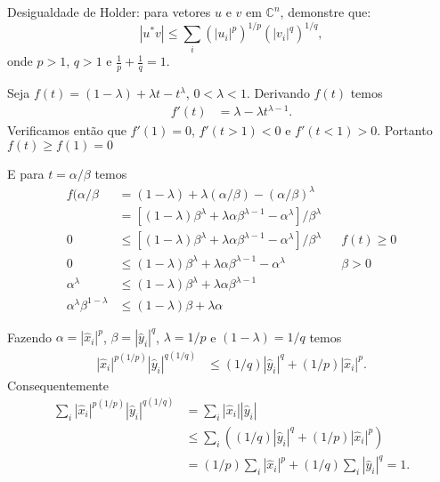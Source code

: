 \documentclass[a4paper,12pt, leqno, answers]{exam}
\begin{document}
\thispagestyle{headandfoot}
\begin{questions}
     Desigualdade de Holder: para vetores $u$ e $v$ em $\mathbb{C}^n$, demonstre que:
    \[
    | u^* v | \leq \sum_i \left( | u_i |^p \right)^{1/p} \left( | v_i |^q \right)^{1/q},
    \]
    onde $p > 1$, $q > 1$ e $\frac{1}{p} + \frac{1}{q} = 1$.
    \begin{solution}
        Seja $f(t) = \left( 1 - \lambda \right) + \lambda t - t^\lambda$, $0 < \lambda < 1$. Derivando $f(t)$ temos
        \begin{align*}
            f'(t) &= \lambda - \lambda t^{\lambda - 1}.
        \end{align*}
        Verificamos ent\~{a}o que $f'(1) = 0$, $f'(t > 1) < 0$ e $f'(t < 1) > 0$. Portanto $f(t) \geq f(1) = 0$ 

        E para $t = \alpha / \beta$ temos
        \begin{align*}
            f(\alpha / \beta &= \left( 1 - \lambda \right) + \lambda \left( \alpha / \beta \right) - \left( \alpha / \beta \right)^\lambda \\
            &= \left[ \left( 1 - \lambda \right) \beta^\lambda + \lambda \alpha \beta^{\lambda - 1} - \alpha^\lambda \right] / \beta^\lambda \\
            0 &\leq \left[ \left( 1 - \lambda \right) \beta^\lambda + \lambda \alpha \beta^{\lambda - 1} - \alpha^\lambda \right] / \beta^\lambda && f(t) \geq 0 \\
            0 &\leq \left( 1 - \lambda \right) \beta^\lambda + \lambda \alpha \beta^{\lambda - 1} - \alpha^\lambda && \beta > 0 \\
            \alpha^\lambda &\leq \left( 1 - \lambda \right) \beta^\lambda + \lambda \alpha \beta^{\lambda - 1} \\
            \alpha^\lambda \beta^{1 - \lambda} &\leq \left( 1 - \lambda \right) \beta + \lambda \alpha
        \end{align*}

        Fazendo $\alpha = | \hat{x}_i |^p$, $\beta = | \hat{y}_i |^q$, $\lambda = 1 / p$ e $(1 - \lambda) = 1 / q$ temos
        \begin{align*}
            | \hat{x}_i |^{p \left( 1 / p \right)} | \hat{y}_i |^{q \left( 1 / q \right)} &\leq \left( 1 / q \right) | \hat{y}_i |^q + \left( 1 / p \right) | \hat{x}_i |^p.
        \end{align*}
        Consequentemente
        \begin{align*}
            \sum_i | \hat{x}_i |^{p \left( 1 / p \right)} | \hat{y}_i |^{q \left( 1 / q \right)} &= \sum_i | \hat{x}_i | | \hat{y}_i | \\
            &\leq \sum_i \left( \left( 1 / q \right) | \hat{y}_i |^q + \left( 1 / p \right) | \hat{x}_i |^p \right) \\
            &= \left( 1 / p \right) \sum_i | \hat{x}_i |^p + \left( 1 / q \right) \sum_i | \hat{y}_i |^q = 1.
        \end{align*}


\end{solution}
\end{questions}
\end{document}
